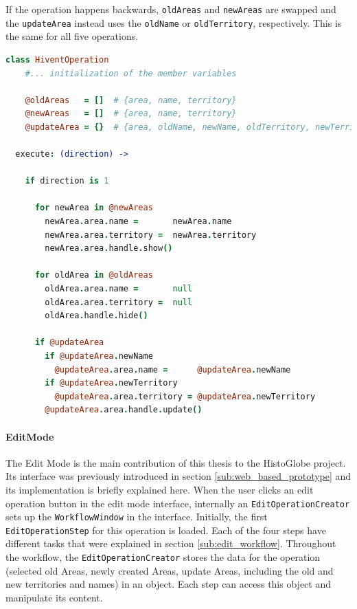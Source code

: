If the operation happens backwards, \texttt{oldAreas} and \texttt{newAreas} are swapped and the \texttt{updateArea} instead uses the \texttt{oldName} or \texttt{oldTerritory}, respectively. This is the same for all five operations.

\begin{center}
\begin{minipage}[t]{0.9\textwidth}
\begin{lstlisting}[language=coffeescript,
  caption=Execution of an \texttt{HiventOperation} in forward direction,
  label=lst:hivent_operation]
class HiventOperation
    #... initialization of the member variables

    @oldAreas   = []  # {area, name, territory}
    @newAreas   = []  # {area, name, territory}
    @updateArea = {}  # {area, oldName, newName, oldTerritory, newTerritory}

  execute: (direction) ->

    if direction is 1

      for newArea in @newAreas
        newArea.area.name =       newArea.name
        newArea.area.territory =  newArea.territory
        newArea.area.handle.show()

      for oldArea in @oldAreas
        oldArea.area.name =       null
        oldArea.area.territory =  null
        oldArea.handle.hide()

      if @updateArea
        if @updateArea.newName
          @updateArea.area.name =      @updateArea.newName
        if @updateArea.newTerritory
          @updateArea.area.territory = @updateArea.newTerritory
        @updateArea.area.handle.update()
\end{lstlisting}
\end{minipage}
\end{center}


\paragraph{EditMode} %
\label{par:editmode}

The Edit Mode is the main contribution of this thesis to the HistoGlobe project.
Its interface was previously introduced in section \ref{sub:web_based_prototype} and its implementation is briefly explained here. When the user clicks an edit operation button in the edit mode interface, internally an \texttt{EditOperationCreator} sets up the \texttt{WorkflowWindow} in the interface. Initially, the first \texttt{EditOperationStep} for this operation is loaded. Each of the four steps have different tasks that were explained in section \ref{sub:edit_workflow}. Throughout the workflow, the \texttt{EditOperationCreator} stores the data for the operation (selected old Areas, newly created Areas, update Areas, including the old and new territories and names) in an object. Each step can access this object and manipulate its content.

